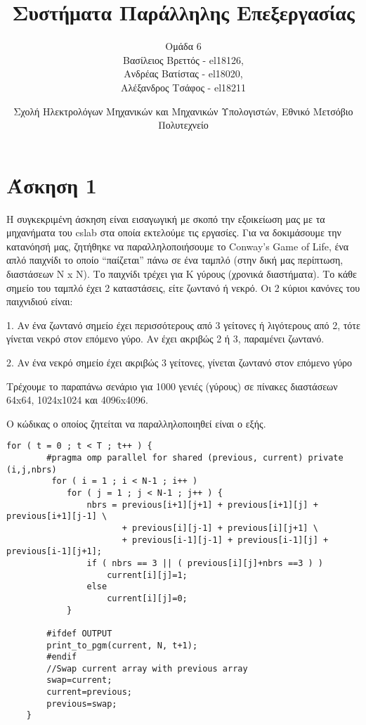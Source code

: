 \documentclass[letterpaper,12pt]{article}
\begin{document}
\title{Συστήματα Παράλληλης Επεξεργασίας}
\author{Ομάδα 6 \\
Βασίλειος Βρεττός - el18126, \\
Ανδρέας Βατίστας - el18020, \\
Αλέξανδρος Τσάφος - el18211\\}
\date{Σχολή Ηλεκτρολόγων Μηχανικών και Μηχανικών Υπολογιστών, Εθνικό Μετσόβιο Πολυτεχνείο}
\maketitle




\section{Άσκηση 1}
Η συγκεκριμένη άσκηση είναι εισαγωγική με σκοπό την εξοικείωση μας με τα μηχανήματα του cslab στα οποία εκτελούμε τις εργασίες. Για να δοκιμάσουμε την κατανόησή μας, ζητήθηκε να παραλληλοποιήσουμε το Conway’s Game of Life, ένα απλό παιχνίδι το οποίο “παίζεται” πάνω σε ένα ταμπλό (στην δική μας περίπτωση, διαστάσεων N x N). Το παιχνίδι τρέχει για Κ γύρους (χρονικά διαστήματα). Το κάθε σημείο του ταμπλό έχει 2 καταστάσεις, είτε ζωντανό ή νεκρό. Οι 2 κύριοι κανόνες του παιχνιδιού είναι: \newline

1.	Αν ένα ζωντανό σημείο έχει περισσότερους από 3 γείτονες ή λιγότερους από 2, τότε γίνεται νεκρό στον επόμενο γύρο. Αν έχει ακριβώς 2 ή 3, παραμένει ζωντανό. 

2.	Αν ένα νεκρό σημείο έχει ακριβώς 3 γείτονες, γίνεται ζωντανό στον επόμενο γύρο \newline

Τρέχουμε το παραπάνω σενάριο για 1000 γενιές (γύρους) σε πίνακες διαστάσεων 64x64, 1024x1024 και 4096x4096. \newline

Ο κώδικας ο οποίος ζητείται να παραλληλοποιηθεί είναι ο εξής.


\begin{lstlisting}
for ( t = 0 ; t < T ; t++ ) {
        #pragma omp parallel for shared (previous, current) private (i,j,nbrs)
         for ( i = 1 ; i < N-1 ; i++ )
            for ( j = 1 ; j < N-1 ; j++ ) {
                nbrs = previous[i+1][j+1] + previous[i+1][j] + previous[i+1][j-1] \
                       + previous[i][j-1] + previous[i][j+1] \
                       + previous[i-1][j-1] + previous[i-1][j] + previous[i-1][j+1];
                if ( nbrs == 3 || ( previous[i][j]+nbrs ==3 ) )
                    current[i][j]=1;
                else
                    current[i][j]=0;
            }

        #ifdef OUTPUT
        print_to_pgm(current, N, t+1);
        #endif
        //Swap current array with previous array
        swap=current;
        current=previous;
        previous=swap;
    }
\end{lstlisting}
\end{document}
